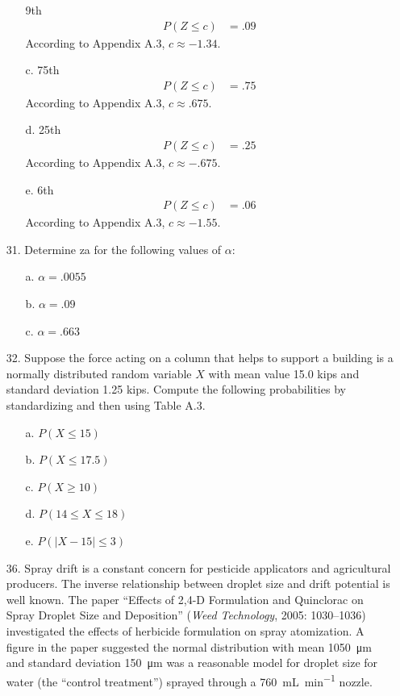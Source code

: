 \documentclass[letterpaper,12pt]{article}
\begin{document}
\begin{enumerate}
\begin{enumerate}
        9th
        \begin{align*}
          P(Z \le c) &= .09
        \end{align*}
        According to Appendix A.3, $c \approx -1.34$.
      \item[c.]
        75th
        \begin{align*}
          P(Z \le c) &= .75
        \end{align*}
        According to Appendix A.3, $c \approx .675$.
      \item[d.]
        25th
        \begin{align*}
          P(Z \le c) &= .25
        \end{align*}
        According to Appendix A.3, $c \approx -.675$.
      \item[e.]
        6th
        \begin{align*}
          P(Z \le c) &= .06
        \end{align*}
        According to Appendix A.3, $c \approx -1.55$.
    \end{enumerate}
  \item[31.]
    Determine za for the following values of $\alpha$:
    \begin{enumerate}
      \item[a.]
        $\alpha = .0055$
      \item[b.]
        $\alpha = .09$
      \item[c.]
        $\alpha = .663$
    \end{enumerate}
  \item[32.]
    Suppose the force acting on a column that helps to support a building is a normally distributed random variable $X$ with mean value 15.0 kips and standard deviation 1.25 kips. Compute the following probabilities by standardizing and then using Table A.3.
    \begin{enumerate}
      \item[a.]
        $P(X \le 15)$
      \item[b.]
        $P(X \le 17.5)$
      \item[c.]
        $P(X \ge 10)$
      \item[d.]
        $P(14 \le X \le 18)$
      \item[e.]
        $P(|X - 15| \le 3)$
    \end{enumerate}
  \item[36.]
    Spray drift is a constant concern for pesticide applicators and agricultural producers. The inverse relationship between droplet size and drift potential is well known. The paper ``Effects of 2,4-D Formulation and Quinclorac on Spray Droplet Size and Deposition'' (\textit{Weed Technology}, 2005: 1030–1036) investigated the effects of herbicide formulation on spray atomization. A figure in the paper suggested the normal distribution with mean \qty{1050}{\micro\meter} and standard deviation \qty{150}{\micro\meter} was a reasonable model for droplet size for water (the ``control treatment'') sprayed through a \qty{760}{\milli\liter\per\minute} nozzle.

\end{enumerate}
\end{document}
